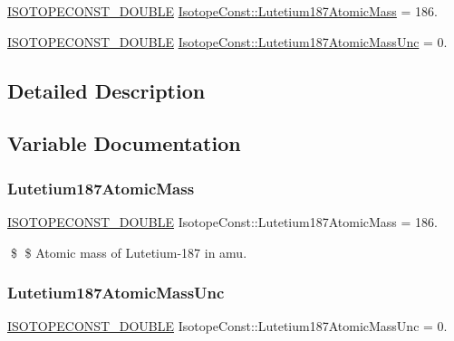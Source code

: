 \begin{DoxyCompactItemize}
\item 
\mbox{\hyperlink{group___isotope_const-_macros_ga8f45a7272ce02c0b4c65c44636ed719a}{I\+S\+O\+T\+O\+P\+E\+C\+O\+N\+S\+T\+\_\+\+D\+O\+U\+B\+LE}} \mbox{\hyperlink{group___isotope_const-_lutetium-_lu187_gab2bd2d5e4ef1dcbee58e7933029d6ed2}{Isotope\+Const\+::\+Lutetium187\+Atomic\+Mass}} = 186.
\item 
\mbox{\hyperlink{group___isotope_const-_macros_ga8f45a7272ce02c0b4c65c44636ed719a}{I\+S\+O\+T\+O\+P\+E\+C\+O\+N\+S\+T\+\_\+\+D\+O\+U\+B\+LE}} \mbox{\hyperlink{group___isotope_const-_lutetium-_lu187_ga05db2b8787e46d6ab375057c9d0083c5}{Isotope\+Const\+::\+Lutetium187\+Atomic\+Mass\+Unc}} = 0.
\end{DoxyCompactItemize}


\subsection{Detailed Description}


\subsection{Variable Documentation}
\mbox{\label{group___isotope_const-_lutetium-_lu187_gab2bd2d5e4ef1dcbee58e7933029d6ed2}} 
\subsubsection{\texorpdfstring{Lutetium187\+Atomic\+Mass}{Lutetium187AtomicMass}}
{\footnotesize\ttfamily \mbox{\hyperlink{group___isotope_const-_macros_ga8f45a7272ce02c0b4c65c44636ed719a}{I\+S\+O\+T\+O\+P\+E\+C\+O\+N\+S\+T\+\_\+\+D\+O\+U\+B\+LE}} Isotope\+Const\+::\+Lutetium187\+Atomic\+Mass = 186.}

\$ \$ Atomic mass of Lutetium-\/187 in amu. \mbox{\label{group___isotope_const-_lutetium-_lu187_ga05db2b8787e46d6ab375057c9d0083c5}} 
\subsubsection{\texorpdfstring{Lutetium187\+Atomic\+Mass\+Unc}{Lutetium187AtomicMassUnc}}
{\footnotesize\ttfamily \mbox{\hyperlink{group___isotope_const-_macros_ga8f45a7272ce02c0b4c65c44636ed719a}{I\+S\+O\+T\+O\+P\+E\+C\+O\+N\+S\+T\+\_\+\+D\+O\+U\+B\+LE}} Isotope\+Const\+::\+Lutetium187\+Atomic\+Mass\+Unc = 0.}

